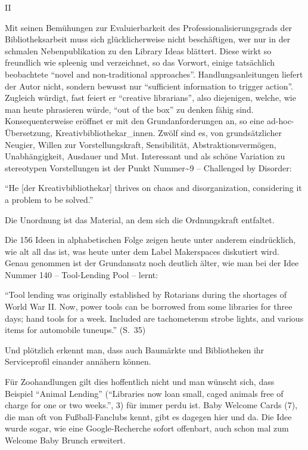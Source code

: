 \documentclass[a4paper,
fontsize=11pt,
oneside,
numbers=noperiodatend,
parskip=half-,
bibliography=totoc,
final
]{scrartcl}
\begin{document}
II

Mit seinen Bemühungen zur Evaluierbarkeit des Professionalisierungsgrads
der Bibliotheksarbeit muss sich glücklicherweise nicht beschäftigen, wer
nur in der schmalen Nebenpublikation zu den Library Ideas blättert.
Diese wirkt so freundlich wie spleenig und verzeichnet, so das Vorwort,
einige tatsächlich beobachtete \enquote{novel and non-traditional
approaches}. Handlungsanleitungen liefert der Autor nicht, sondern
bewusst nur \enquote{sufficient information to trigger action}. Zugleich
würdigt, fast feiert er \enquote{creative librarians}, also diejenigen,
welche, wie man heute phrasieren würde, \enquote{out of the box} zu
denken fähig sind. Konsequenterweise eröffnet er mit den
Grundanforderungen an, so eine ad-hoc-Übersetzung,
Kreativbibliothekar\_innen. Zwölf sind es, von grundsätzlicher Neugier,
Willen zur Vorstellungskraft, Sensibilität, Abstraktionsvermögen,
Unabhängigkeit, Ausdauer und Mut. Interessant und als schöne Variation
zu stereotypen Vorstellungen ist der Punkt Nummer\textasciitilde{}9 --
Challenged by Disorder:

\enquote{He {[}der Kreativbibliothekar{]} thrives on chaos and
disorganization, considering it a problem to be solved.}

Die Unordnung ist das Material, an dem sich die Ordnungskraft entfaltet.

Die 156 Ideen in alphabetischen Folge zeigen heute unter anderem
eindrücklich, wie alt all das ist, was heute unter dem Label Makerspaces
diskutiert wird. Genau genommen ist der Grundansatz noch deutlich älter,
wie man bei der Idee Nummer 140 -- Tool-Lending Pool -- lernt:

\enquote{Tool lending was originally established by Rotarians during the
shortages of World War II. Now, power tools can be borrowed from some
libraries for three days; hand tools for a week. Included are
tachometersm strobe lights, and various items for automobile tuneups.}
(S.~35)

Und plötzlich erkennt man, dass auch Baumärkte und Bibliotheken ihr
Serviceprofil einander annähern können.

Für Zoohandlungen gilt dies hoffentlich nicht und man wünscht sich, dass
Beispiel \enquote{Animal Lending} (\enquote{Libraries now loan small,
caged animals free of charge for one or two weeks.}, 3) für immer perdu
ist. Baby Welcome Cards (7), die man oft von Fußball-Fanclubs kennt,
gibt es dagegen hier und da. Die Idee wurde sogar, wie eine
Google-Recherche sofort offenbart, auch schon mal zum Welcome Baby
Brunch erweitert.
\end{document}
